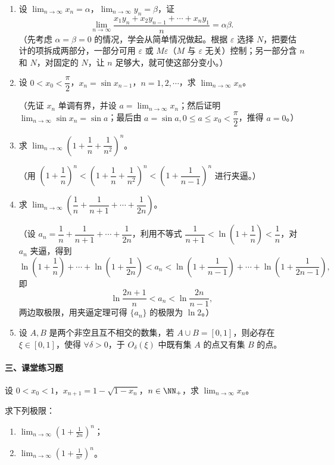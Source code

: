 \begin{enumerate}[label=\arabic*.]
  \item 设 $\displaystyle\lim_{n\to\infty}x_n=\alpha$，$\displaystyle\lim_{n\to\infty}y_n=\beta$，证
  \[
    \lim_{n\to\infty}\frac{x_1y_n+x_2y_{n-1}+\cdots+x_ny_1}{n}=\alpha\beta.
  \]
  （先考虑 $\alpha=\beta=0$ 的情况，学会从简单情况做起。根据 $\varepsilon$ 选择 $N$，把要估计的项拆成两部分，一部分可用 $\varepsilon$ 或 $M\varepsilon$（$M$ 与 $\varepsilon$ 无关）控制；另一部分含 $n$ 和 $N$，对固定的 $N$，让 $n$ 足够大，就可使这部分变小。）
  \item 设 $0<x_0<\dfrac\pi2$，$x_n=\sin x_{n-1}$，$n=1,2,\cdots$，求 $\displaystyle\lim_{n\to\infty}x_n$。

  （先证 $x_n$ 单调有界，并设 $a=\displaystyle\lim_{n\to\infty}x_n$；然后证明 $\displaystyle\lim_{n\to\infty}\sin x_n=\sin a$；最后由 $a=\sin a,0\le a\le x_0<\dfrac\pi2$，推得 $a=0$。）
  \item 求 $\displaystyle\lim_{n\to\infty}\left(1+\dfrac1n+\dfrac1{n^2}\right)^n$。

  （用 $\left(1+\dfrac1n\right)^n<\left(1+\dfrac1n+\dfrac1{n^2}\right)^n<\left(1+\dfrac1{n-1}\right)^n$ 进行夹逼。）
  \item 求 $\displaystyle\lim_{n\to\infty}\left(\dfrac1n+\dfrac1{n+1}+\cdots+\dfrac1{2n}\right)$。

  （设 $a_n=\dfrac1n+\dfrac1{n+1}+\cdots+\dfrac1{2n}$，利用不等式 $\dfrac1{n+1}<\ln\left(1+\dfrac1n\right)<\dfrac1n$，对 $a_n$ 夹逼，得到
  \[
    \ln\left(1+\frac1n\right)+\cdots+\ln\left(1+\frac1{2n}\right)
    <a_n
    <\ln\left(1+\frac1{n-1}\right)+\cdots+\ln\left(1+\frac1{2n-1}\right),
  \]
  即
  \[
    \ln\frac{2n+1}{n}<a_n<\ln\frac{2n}{n-1},
  \]
  两边取极限，用夹逼定理可得 $\{a_n\}$ 的极限为 $\ln2$。）
  \item 设 $A,B$ 是两个非空且互不相交的数集，若 $A\cup B=[0,1]$，则必存在 $\xi\in[0,1]$，使得 $\forall\delta>0$，于 $O_\delta(\xi)$ 中既有集 $A$ 的点又有集 $B$ 的点。
\end{enumerate}

\paragraph{三、课堂练习题}

\begin{xexercise}[1]
设 $0<x_0<1$，$x_{n+1}=1-\sqrt{1-x_n}$，$n\in\NN_+$，求 $\displaystyle\lim_{n\to\infty}x_n$。
\end{xexercise}

\begin{xexercise}[2]
求下列极限：
  \begin{enumerate}[label=(\arabic*)]
    \item $\displaystyle\lim_{n\to\infty}\left(1+\frac1{2n}\right)^n$；
    \item $\displaystyle\lim_{n\to\infty}\left(1+\frac1{n^2}\right)^n$。
  \end{enumerate}
\end{xexercise}

